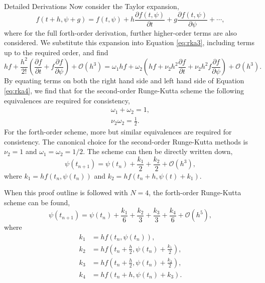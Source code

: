 \begin{chapter}{Detailed Derivations\label{app:App2}}
Now consider the Taylor expansion,
\begin{equation*}
f(t+h,\psi+g) = f(t,\psi) + h\frac{\partial f(t,\psi)}{\partial t} +g\frac{\partial f(t,\psi)}{\partial \psi} + \cdots,
\end{equation*}
where for the full forth-order derivation, further higher-order terms are also considered. We substitute this expansion into Equation \ref{eq:rka3}, including terms up to the required order, and find
\begin{equation}
hf + \frac{h^2}{2!}\left(\frac{\partial f}{\partial t} + f\frac{\partial f}{\partial \psi}\right) + \mathcal{O}(h^3) = \omega_1hf + \omega_2\left( hf + \nu_2h^2 \frac{\partial f}{\partial t} + \nu_2h^2f\frac{\partial f}{\partial \psi} \right)+ \mathcal{O}(h^3).
\end{equation}\label{eq:rka4}
By equating terms on both the right hand side and left hand side of Equation \ref{eq:rka4}, we find that for the second-order Runge-Kutta scheme the following equivalences are required for consistency,
\begin{align*}
\omega_1 + \omega_2 = 1,\\
\nu_2\omega_2 = \frac{1}{2}.
\end{align*}
For the forth-order scheme, more but similar equivalences are required for consistency. The canonical choice for the second-order Runge-Kutta methods is
$\nu_2=1$ and $\omega_1 = \omega_2 = 1/2$. The scheme can then be directly written down,
\begin{equation}
\psi(t_{n+1}) = \psi(t_n) + \frac{k_1}{2} + \frac{k_2}{2} + \mathcal{O}(h^3),
\end{equation}
where $k_1 = hf(t_n,\psi(t_n))$ and $k_2 = hf(t_n+h,\psi(t)+k_1)$.

When this proof outline is followed with $N=4$, the forth-order Runge-Kutta scheme can be found,
\begin{equation}
    \psi(t_{n+1}) = \psi(t_n) + \frac{k_1}{6}+ \frac{k_2}{3}+ \frac{k_3}{3} + \frac{k_4}{6} + \mathcal{O}(h^5),
\end{equation}
where
\begin{equation*}
\begin{split}
    k_1 &= hf(t_n,\psi(t_n)),\\
    k_2 &= hf(t_n+\frac{h}{2},\psi(t_n)+\frac{k_1}{2}),\\
    k_3 &= hf(t_n+\frac{h}{2},\psi(t_n)+\frac{k_2}{2}),\\
    k_4 &= hf(t_n+h,\psi(t_n)+k_3).
\end{split}
\end{equation*}


\end{chapter}
